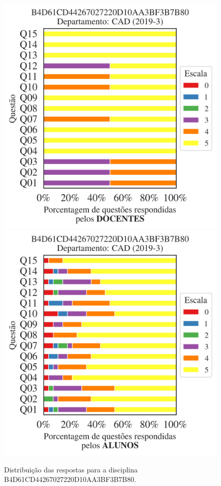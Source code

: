 \documentclass[a4paper,10pt]{article}
\begin{document}
\begin{figure}[h]
\centering
\includegraphics[width=0.485\linewidth]{analise_disciplina_departamento_CAD_B4D61CD44267027220D10AA3BF3B7B80_docentes.png}
\includegraphics[width=0.485\linewidth]{analise_disciplina_departamento_CAD_B4D61CD44267027220D10AA3BF3B7B80_alunos.png}
\caption{\label{fig:analise_geral_departamento}                Distribuição das respostas para a disciplina B4D61CD44267027220D10AA3BF3B7B80. }
\end{figure}
\end{document}

